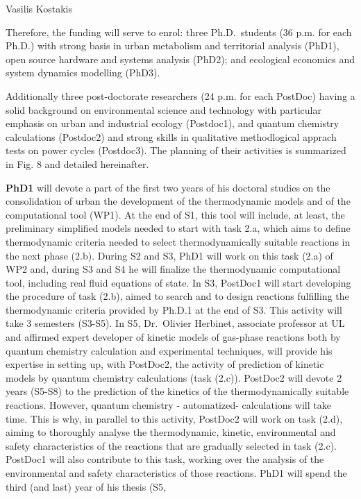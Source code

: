 \documentclass[
  12pt,
  a4paperpaper,
  onecolumn]{article}
\begin{document}
Vasilis Kostakis

Therefore, the funding will serve to enrol: three Ph.D.~students (36
p.m. for each Ph.D.) with strong basis in urban metabolism and
territorial analysis (PhD1), open source hardware and systems analysis
(PhD2); and ecological economics and system dynamics modelling (PhD3).

Additionally three post-doctorate researchers (24 p.m. for each PostDoc)
having a solid background on environmental science and technology with
particular emphasis on urban and industrial ecology (Postdoc1), and
quantum chemistry calculations (Postdoc2) and strong skills in
qualitative methodlogical apprach tests on power cycles (Postdoc3). The
planning of their activities is summarized in Fig. 8 and detailed
hereinafter.

\textbf{PhD1} will devote a part of the first two years of his doctoral
studies on the consolidation of urban the development of the
thermodynamic models and of the computational tool (WP1). At the end of
S1, this tool will include, at least, the preliminary simplified models
needed to start with task 2.a, which aims to define thermodynamic
criteria needed to select thermodynamically suitable reactions in the
next phase (2.b). During S2 and S3, PhD1 will work on this task (2.a) of
WP2 and, during S3 and S4 he will finalize the thermodynamic
computational tool, including real fluid equations of state. In S3,
PostDoc1 will start developing the procedure of task (2.b), aimed to
search and to design reactions fulfilling the thermodynamic criteria
provided by Ph.D.1 at the end of S3. This activity will take 3 semesters
(S3-S5). In S5, Dr.~Olivier Herbinet, associate professor at UL and
affirmed expert developer of kinetic models of gas-phase reactions both
by quantum chemistry calculation and experimental techniques, will
provide his expertise in setting up, with PostDoc2, the activity of
prediction of kinetic models by quantum chemistry calculations (task
(2.c)). PostDoc2 will devote 2 years (S5-S8) to the prediction of the
kinetics of the thermodynamically suitable reactions. However, quantum
chemistry - automatized- calculations will take time. This is why, in
parallel to this activity, PostDoc2 will work on task (2.d), aiming to
thoroughly analyse the thermodynamic, kinetic, environmental and safety
characteristics of the reactions that are gradually selected in task
(2.c). PostDoc1 will also contribute to this task, working over the
analysis of the environmental and safety characteristics of those
reactions. PhD1 will spend the third (and last) year of his thesis (S5,
\end{document}
